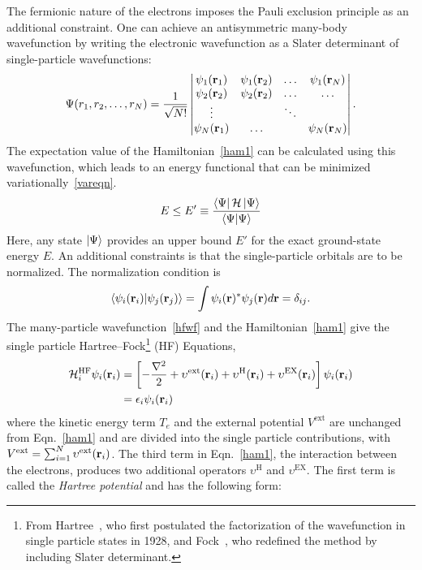 The fermionic nature of the electrons imposes the Pauli exclusion principle as an additional constraint. One can achieve an antisymmetric many-body wavefunction by writing the electronic wavefunction as a Slater determinant of single-particle wavefunctions:
\begin{equation}\label{hfwf}
\Psi(r_1,r_2,\dots,r_N) = \frac{1}{\sqrt{N!}}\begin{vmatrix}
\psi_1(\vb{r}_1) & \psi_1(\vb{r}_2) & \dots & \psi_1(\vb{r}_N) \\
\psi_2(\vb{r}_2) & \psi_2(\vb{r}_2) & \dots &  \dots			\\
\vdots			 &					& \ddots &					\\
\psi_N(\vb{r}_1) & \dots			&		 &  \psi_N(\vb{r}_N) 
\end{vmatrix}.
\end{equation}
The expectation value of the Hamiltonian~\eqref{ham1} can be calculated using this wavefunction, which leads to an energy functional that can be minimized variationally~\eqref{vareqn}. 
\begin{equation}\label{vareqn}
E \le E' \equiv \frac{\bra{\Psi}\mathcal{H}\ket{\Psi}}{\braket{\Psi}{\Psi}} 
\end{equation}
Here, any state $\ket{\Psi}$ provides an upper bound $E'$ for the exact ground-state energy $E$. An additional constraints is that the single-particle orbitals are to be normalized. The normalization condition is
\begin{equation}\label{norm1}
\braket{\psi_i(\vb{r}_i)}{\psi_j(\vb{r}_j)} = \int \psi_i(\vb{r})^{\ast} \psi_j(\vb{r})d\vb{r} = \delta_{ij}.
\end{equation}
The many-particle wavefunction~\eqref{hfwf} and the Hamiltonian~\eqref{ham1} give the single particle Hartree--Fock\footnote{From Hartree~\cite{hartree}, who first postulated the factorization of the wavefunction in single particle states in 1928, and Fock~\cite{fock}, who redefined the method by including Slater determinant.} (HF) Equations,
\begin{align}\label{hfeqn}
\begin{split}
\mathcal{H}_i^{\text{HF}} \psi_i(\vb{r}_i) & = \left[-\frac{\nabla^2}{2} + \upsilon^{\text{ext}}(\vb{r}_i) + \upsilon^{\text{H}}(\vb{r}_i) + \upsilon^{\text{EX}}(\vb{r}_i) \right] \psi_i(\vb{r}_i) \\
		& = \epsilon_i\psi_i(\vb{r}_i)
\end{split}
\end{align}
where the kinetic energy term $T_e$ and the external potential $V^{\text{ext}}$ are unchanged from Eqn.~\eqref{ham1} and are divided into the single particle contributions, with $V^{\text{ext}} = \sum^N_{i=1}\upsilon^{\text{ext}}(\vb{r}_i)$. The third term in Eqn.~\eqref{ham1}, the interaction between the electrons, produces two additional operators $\upsilon^{\text{H}}$ and $\upsilon^{\text{EX}}$. The first term is called the \textit{Hartree potential} and has the following form:
